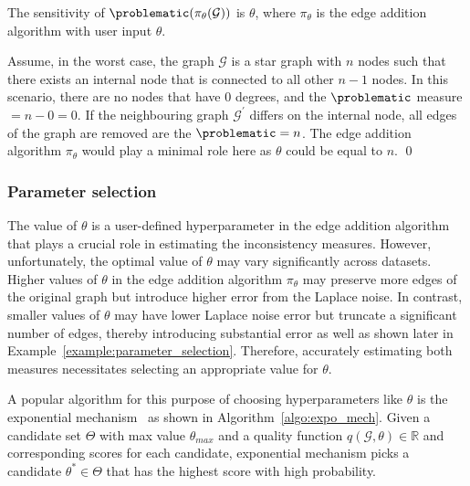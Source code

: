 \begin{lemma}
    The sensitivity of $\problematic(\pi_\theta(\mathcal{G}))$ is $\theta$, where $\pi_\theta$ is the edge addition algorithm with user input $\theta$.
    \label{lemma:sens_problematic}
\end{lemma}

\proof
Assume, in the worst case, the graph $\mathcal{G}$ is a star graph with $n$ nodes such that there exists an internal node that is connected to all other $n-1$ nodes. In this scenario, there are no nodes that have 0 degrees, and the $\problematic$ measure $= n-0 = 0$. If the neighbouring graph $\mathcal{G}^\prime$ differs on the internal node, all edges of the graph are removed are the $\problematic = n$. The edge addition algorithm $\pi_\theta$ would play a minimal role here as $\theta$ could be equal to $n$.
\qed



\subsubsection{Parameter selection}\label{sec:expo_mech}

The value of $\theta$ is a user-defined hyperparameter in the edge addition algorithm that plays a crucial role in estimating the inconsistency measures. However, unfortunately, the optimal value of $\theta$ may vary significantly across datasets. Higher values of $\theta$ in the edge addition algorithm $\pi_\theta$ may preserve more edges of the original graph but introduce higher error from the Laplace noise. In contrast, smaller values of $\theta$ may have lower Laplace noise error but truncate a significant number of edges, thereby introducing substantial error as well as shown later in Example~\ref{example:parameter_selection}. Therefore, accurately estimating both measures necessitates selecting an appropriate value for $\theta$.

A popular algorithm for this purpose of choosing hyperparameters like $\theta$ is the exponential mechanism~\cite{mcsherry2007mechanism} as shown in Algorithm~\ref{algo:expo_mech}. Given a candidate set $\Theta$ with max value $\theta_{max}$ and a quality function $q(\mathcal{G}, \theta) \in \mathbb{R}$ and corresponding scores for each candidate, exponential mechanism picks a candidate $\theta^* \in \Theta$ that has the highest score with high probability.

